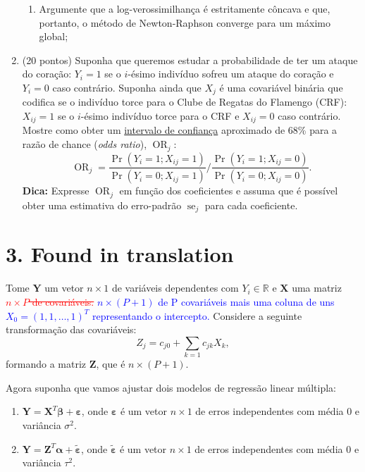 \documentclass[a4paper,10pt, notitlepage]{report}
\newcommand{\pr}{\operatorname{Pr}} %
\newif\ifanswers
\begin{document}
\begin{enumerate}[label=\alph*)]
\begin{enumerate}
      \item Argumente que a log-verossimilhança é estritamente côncava e que, portanto, o método de Newton-Raphson converge para um máximo global;
  \end{enumerate}
  \item (20 pontos) Suponha que queremos estudar a probabilidade de ter um ataque do coração: $Y_i = 1$ se o $i$-ésimo indivíduo sofreu um ataque do coração e $Y_i = 0$ caso contrário.
 Suponha ainda que  $X_j$ é uma covariável binária que codifica se o indivíduo torce para o Clube de Regatas do Flamengo (CRF): $X_{ij} = 1$ se o $i$-ésimo indivíduo torce para o CRF e $X_{ij} = 0$ caso contrário.
 Mostre como obter um \underline{intervalo de confiança} aproximado de 68\% para a razão de chance (\textit{odds ratio}), $\operatorname{OR}_j$:
 \begin{equation*}
     \operatorname{OR}_j = \frac{\pr(Y_i = 1; X_{ij} = 1)}{\pr(Y_i = 0; X_{ij} = 1)}  \bigg/\frac{\pr(Y_i = 1; X_{ij} = 0)}{\pr(Y_i = 0; X_{ij} = 0)}.
 \end{equation*}
 \textbf{Dica:} Expresse $\operatorname{OR}_j$ em função dos coeficientes e assuma que é possível obter uma estimativa do erro-padrão $\operatorname{se}_j$ para cada coeficiente.  
\end{enumerate} 
\ifanswers

\fi

\section*{3. Found in translation}

Tome $\boldsymbol{Y}$ um vetor $n \times 1$ de variáveis dependentes com $Y_i \in \mathbb{R}$ e $\boldsymbol{X}$ uma matriz \textcolor{red}{\sout{$n \times P$ de covariáveis.}} \textcolor{blue}{$n \times (P+1)$ de  P covariáveis mais uma coluna de uns $X_0 = (1,1,\dots,1)^T$ representando o intercepto.} 
Considere a seguinte transformação das covariáveis:
\begin{equation*}
    Z_j = c_{j0} + \sum_{k=1} c_{jk}X_k,
\end{equation*}
formando a matriz $\boldsymbol{Z}$, que é $n \times (P + 1)$.

Agora suponha que vamos ajustar dois modelos de regressão linear múltipla:
\begin{enumerate}[label=\Roman*.]
    \item $\boldsymbol{Y} = \boldsymbol{X}^T \boldsymbol{\beta} + \boldsymbol{\varepsilon}$, onde $\boldsymbol{\varepsilon}$ é um vetor $n \times 1$ de erros independentes com  média $0$ e variância $\sigma^2$. 
    \item  $\boldsymbol{Y} = \boldsymbol{Z}^T \boldsymbol{\alpha} + \tilde{\boldsymbol{\varepsilon}}$, onde $\tilde{\boldsymbol{\varepsilon}}$ é um vetor $n \times 1$ de erros independentes com  média $0$ e variância $\tau^2$. 
\end{enumerate}
\end{document}
